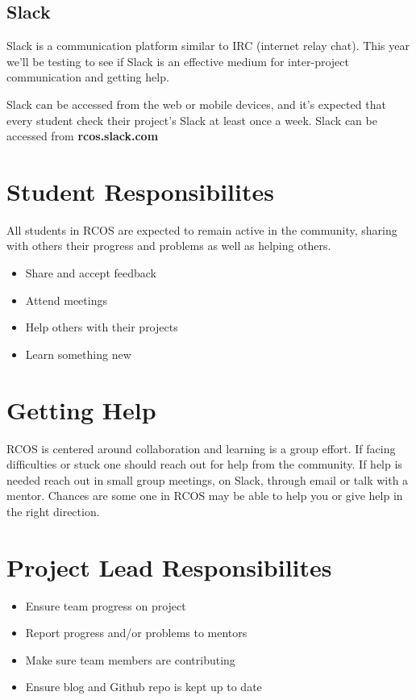 \documentclass[12pt]{article}
\begin{document}
    \subsection{Slack}

    Slack is a communication platform similar to IRC (internet relay chat). This year we'll be testing to see if Slack is an effective medium for inter-project communication and getting help.

    Slack can be accessed from the web or mobile devices, and it's expected that every student check their project's Slack at least once a week. Slack can be accessed from \textbf{rcos.slack.com}

    \section{Student Responsibilites}

    All students in RCOS are expected to remain active in the community, sharing with others their progress and problems as well as helping others.

    \begin{itemize}
        \item Share and accept feedback
        \item Attend meetings
        \item Help others with their projects
        \item Learn something new
    \end{itemize}

    \section{Getting Help}

    RCOS is centered around collaboration and learning is a group effort. If facing difficulties or stuck one should reach out for help from the community. If help is needed reach out in small group meetings, on Slack, through email or talk with a mentor. Chances are some one in RCOS may be able to help you or give help in the right direction.

    \section{Project Lead Responsibilites}

    \begin{itemize}
        \item Ensure team progress on project
        \item Report progress and/or problems to mentors
        \item Make sure team members are contributing
        \item Ensure blog and Github repo is kept up to date
    \end{itemize}
\end{document}
